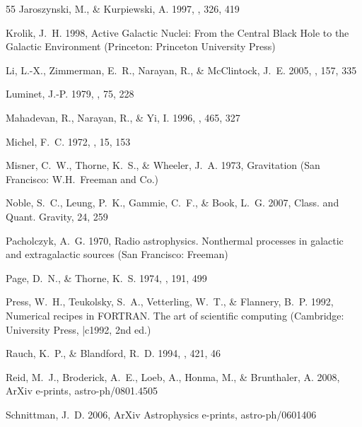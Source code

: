 \documentclass[apj]{emulateapj}
\begin{document}
\begin{thebibliography}{55}
{Jaroszynski}, M., \& {Kurpiewski}, A. 1997, \aap, 326, 419

{Krolik}, J.~H. 1998, {Active Galactic Nuclei: From the Central Black Hole to
  the Galactic Environment} (Princeton: Princeton University Press)

{Li}, L.-X., {Zimmerman}, E.~R., {Narayan}, R., \& {McClintock}, J.~E. 2005,
  \apjs, 157, 335

{Luminet}, J.-P. 1979, \aap, 75, 228

{Mahadevan}, R., {Narayan}, R., \& {Yi}, I. 1996, \apj, 465, 327

{Michel}, F.~C. 1972, \apss, 15, 153

{Misner}, C.~W., {Thorne}, K.~S., \& {Wheeler}, J.~A. 1973, {Gravitation} (San
  Francisco: W.H.~Freeman and Co.)

{Noble}, S.~C., {Leung}, P.~K., {Gammie}, C.~F., \& {Book}, L.~G. 2007, Class.
  and Quant. Gravity, 24, 259

{Pacholczyk}, A.~G. 1970, {Radio astrophysics. Nonthermal processes in galactic
  and extragalactic sources} (San Francisco: Freeman)

{Page}, D.~N., \& {Thorne}, K.~S. 1974, \apj, 191, 499

{Press}, W.~H., {Teukolsky}, S.~A., {Vetterling}, W.~T., \& {Flannery}, B.~P.
  1992, {Numerical recipes in FORTRAN. The art of scientific computing}
  (Cambridge: University Press, |c1992, 2nd ed.)

{Rauch}, K.~P., \& {Blandford}, R.~D. 1994, \apj, 421, 46

{Reid}, M.~J., {Broderick}, A.~E., {Loeb}, A., {Honma}, M., \& {Brunthaler}, A.
  2008, ArXiv e-prints, astro-ph/0801.4505

{Schnittman}, J.~D. 2006, ArXiv Astrophysics e-prints, astro-ph/0601406


\end{thebibliography}
\end{document}
